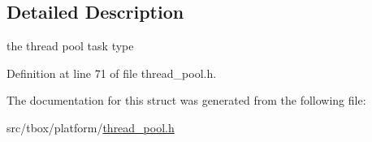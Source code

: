 \subsection{Detailed Description}
the thread pool task type 

Definition at line 71 of file thread\-\_\-pool.\-h.



The documentation for this struct was generated from the following file\-:\begin{DoxyCompactItemize}
\item 
src/tbox/platform/\hyperlink{thread__pool_8h}{thread\-\_\-pool.\-h}\end{DoxyCompactItemize}
